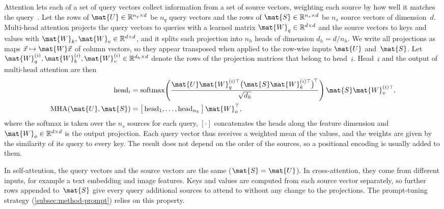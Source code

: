 Attention lets each of a set of query vectors collect information from a set of source vectors, weighting each source by how well it matches the query~\cite{NIPS2017_3f5ee243}.
Let the rows of $\mat{U} \in \mathbb{R}^{n_q \times d}$ be $n_q$ query vectors and the rows of $\mat{S} \in \mathbb{R}^{n_s \times d}$ be $n_s$ source vectors of dimension~$d$.
Multi-head attention projects the query vectors to queries with a learned matrix $\mat{W}_q \in \mathbb{R}^{d \times d}$ and the source vectors to keys and values with $\mat{W}_k, \mat{W}_v \in \mathbb{R}^{d \times d}$, and it splits each projection into $n_h$ heads of dimension $d_h = d / n_h$.
We write all projections as maps $\vec{x} \mapsto \mat{W}\vec{x}$ of column vectors, so they appear transposed when applied to the row-wise inputs $\mat{U}$ and~$\mat{S}$.
Let $\mat{W}_q^{(i)}, \mat{W}_k^{(i)}, \mat{W}_v^{(i)} \in \mathbb{R}^{d_h \times d}$ denote the rows of the projection matrices that belong to head~$i$.
Head~$i$ and the output of multi-head attention are then
\begin{equation}
\begin{aligned}
\operatorname{head}_i &= \operatorname{softmax}\!\left( \frac{\mat{U}\mat{W}_q^{(i)\top} \big(\mat{S}\mat{W}_k^{(i)\top}\big)^{\!\top}}{\sqrt{d_h}} \right) \mat{S}\mat{W}_v^{(i)\top},\\
\operatorname{MHA}(\mat{U}, \mat{S}) &= \big[\operatorname{head}_1, \dots, \operatorname{head}_{n_h}\big]\, \mat{W}_o^{\top},
\end{aligned}
\label{eq:bg-attention}
\end{equation}
where the softmax is taken over the $n_s$ sources for each query, $[\cdot]$ concatenates the heads along the feature dimension and $\mat{W}_o \in \mathbb{R}^{d \times d}$ is the output projection.
Each query vector thus receives a weighted mean of the values, and the weights are given by the similarity of its query to every key.
The result does not depend on the order of the sources, so a positional encoding is usually added to them.

In self-attention, the query vectors and the source vectors are the same ($\mat{S} = \mat{U}$).
In cross-attention, they come from different inputs, for example a text embedding and image features.
Keys and values are computed from each source vector separately, so further rows appended to~$\mat{S}$ give every query additional sources to attend to without any change to the projections.
The prompt-tuning strategy (\cref{subsec:method-prompt}) relies on this property.

